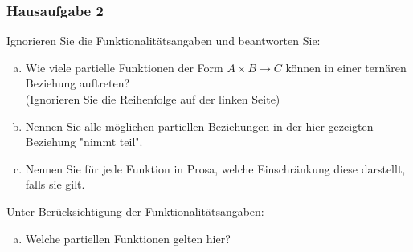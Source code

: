\begin{frame}
	\frametitle{Hausaufgabe 2}
	\vspace{0.25cm}

	\begin{multicols}{2}
		\only<1-4> {
			Ignorieren Sie die Funktionalitätsangaben und beantworten Sie:
			\begin{enumerate}[a)]
				\item<1-> Wie viele partielle Funktionen der Form \( A \times B \rightarrow C \)
				      können in einer ternären Beziehung auftreten? \\
				      (Ignorieren Sie die Reihenfolge auf der linken Seite)
				\item<1-> Nennen Sie alle möglichen partiellen Beziehungen in der hier
				      gezeigten Beziehung "nimmt teil".
				\item<3-> Nennen Sie für jede Funktion in Prosa,
				      welche Einschränkung diese darstellt, falls sie gilt.
			\end{enumerate}
		}
		Unter Berücksichtigung der Funktionalitätsangaben:
		\begin{enumerate}[a)]
			\item Welche partiellen Funktionen gelten hier?
		\end{enumerate}
		\vfill\columnbreak


\end{multicols}
\end{frame}
